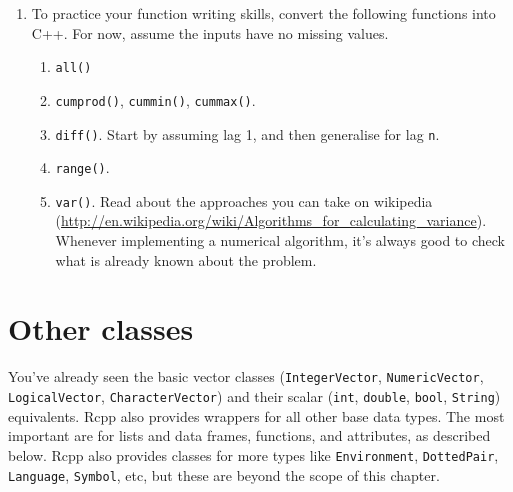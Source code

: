 \documentclass[]{book}
\newenvironment{Shaded}{\begin{snugshade}}{\end{snugshade}}
\newcommand{\BuiltInTok}[1]{#1}
\newcommand{\ControlFlowTok}[1]{\textcolor[rgb]{0.27,0.27,0.27}{\textbf{#1}}}
\newcommand{\DataTypeTok}[1]{\textcolor[rgb]{0.27,0.27,0.27}{#1}}
\newcommand{\DecValTok}[1]{\textcolor[rgb]{0.06,0.06,0.06}{#1}}
\newcommand{\NormalTok}[1]{#1}
\renewcommand{\href}[2]{#2 (\url{#1})}
\begin{document}
\begin{enumerate}
\begin{Shaded}
\begin{Highlighting}[]
\NormalTok{NumericVector f5(NumericVector x, NumericVector y) \{}
  \DataTypeTok{int}\NormalTok{ n = }\BuiltInTok{std::}\NormalTok{max(x.size(), y.size());}
\NormalTok{  NumericVector x1 = rep_len(x, n);}
\NormalTok{  NumericVector y1 = rep_len(y, n);}

\NormalTok{  NumericVector out(n);}

  \ControlFlowTok{for}\NormalTok{ (}\DataTypeTok{int}\NormalTok{ i = }\DecValTok{0}\NormalTok{; i < n; ++i) \{}
\NormalTok{    out[i] = }\BuiltInTok{std::}\NormalTok{min(x1[i], y1[i]);}
\NormalTok{  \}}

  \ControlFlowTok{return}\NormalTok{ out;}
\NormalTok{\}}
\end{Highlighting}
\end{Shaded}
\item
  To practice your function writing skills, convert the following functions
  into C++. For now, assume the inputs have no missing values.

  \begin{enumerate}
  \def\labelenumii{\arabic{enumii}.}
  \item
    \texttt{all()}
  \item
    \texttt{cumprod()}, \texttt{cummin()}, \texttt{cummax()}.
  \item
    \texttt{diff()}. Start by assuming lag 1, and then generalise for lag \texttt{n}.
  \item
    \texttt{range()}.
  \item
    \texttt{var()}. Read about the approaches you can take on
    \href{http://en.wikipedia.org/wiki/Algorithms_for_calculating_variance}{wikipedia}.
    Whenever implementing a numerical algorithm, it's always good to check
    what is already known about the problem.
  \end{enumerate}
\end{enumerate}

\hypertarget{rcpp-classes}{%
\section{Other classes}\label{rcpp-classes}}

You've already seen the basic vector classes (\texttt{IntegerVector}, \texttt{NumericVector}, \texttt{LogicalVector}, \texttt{CharacterVector}) and their scalar (\texttt{int}, \texttt{double}, \texttt{bool}, \texttt{String}) equivalents. Rcpp also provides wrappers for all other base data types. The most important are for lists and data frames, functions, and attributes, as described below. Rcpp also provides classes for more types like \texttt{Environment}, \texttt{DottedPair}, \texttt{Language}, \texttt{Symbol}, etc, but these are beyond the scope of this chapter.
\end{document}
